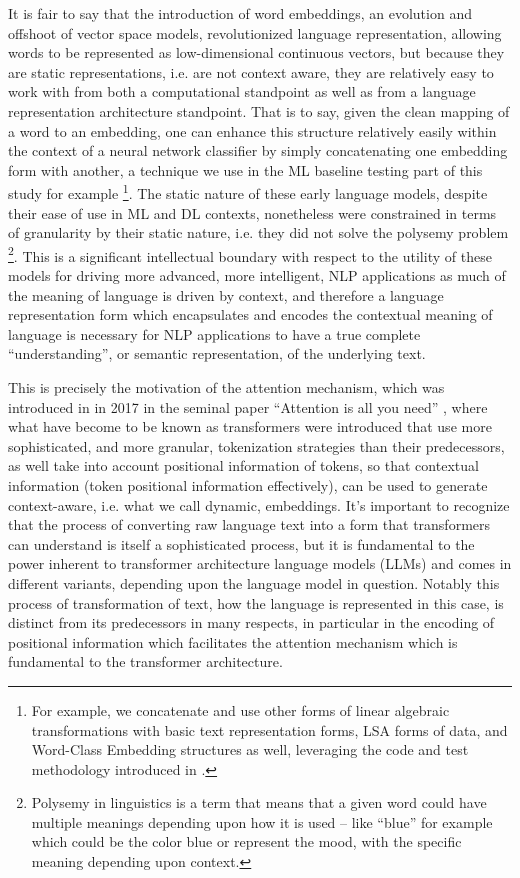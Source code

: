 \documentclass[final]{clv2025}
\begin{document}
It is fair to say that the introduction of word embeddings, an evolution and offshoot of vector space models, revolutionized language representation, allowing words to be represented as low-dimensional continuous vectors, but because they are static representations, i.e. are not context aware, they are relatively easy to work with from both a computational standpoint as well as from a language representation architecture standpoint. That is to say, given the clean mapping of a word to an embedding, one can enhance this structure relatively easily within the context of a neural network classifier by simply concatenating one embedding form with another, a technique we use in the ML baseline testing part of this study for example \footnote{  For example, we concatenate and use other forms of linear algebraic transformations with basic text representation forms, LSA forms of data, and Word-Class Embedding structures as well, leveraging the code and test methodology introduced in \cite{moreo}.}.  The static nature of these early language models, despite their ease of use in ML and DL contexts, nonetheless were constrained in terms of granularity by their static nature, i.e. they did not solve the polysemy problem \footnote{Polysemy in linguistics is a term that means that a given word could have multiple meanings depending upon how it is used – like “blue” for example which could be the color blue or represent the mood, with the specific meaning depending upon context.}. This is a significant intellectual boundary with respect to the utility of these models for driving more advanced, more intelligent, NLP applications as much of the meaning of language is driven by context, and therefore a language representation form which encapsulates and encodes the contextual meaning of language is necessary for NLP applications to have a true complete “understanding”, or semantic representation, of the underlying text.  

This is precisely the motivation of the attention mechanism, which was introduced in in 2017 in the seminal paper “Attention is all you need” \cite{vaswani}, where what have become to be known as transformers were introduced that use more sophisticated, and more granular, tokenization strategies than their predecessors, as well take into account positional information of tokens, so that contextual information (token positional information effectively), can be used to generate context-aware, i.e. what we call dynamic, embeddings. It’s important to recognize that the process of converting raw language text into a form that transformers can understand is itself a sophisticated process, but it is fundamental to the power inherent to transformer architecture language models (LLMs) and comes in different variants, depending upon the language model in question. Notably this process of transformation of text, how the language is represented in this case, is distinct from its predecessors in many respects, in particular in the encoding of positional information which facilitates the attention mechanism which is fundamental to the transformer architecture.
\end{document}
